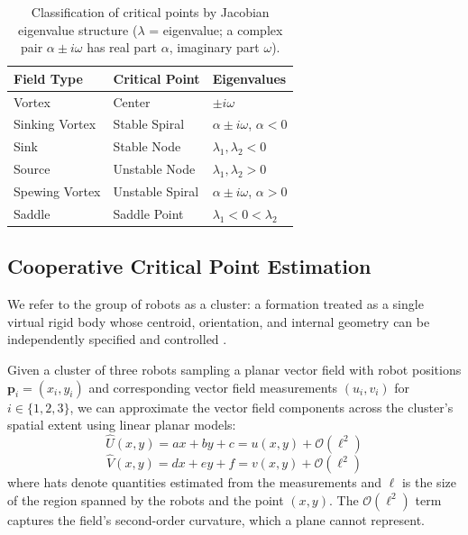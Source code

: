 \documentclass[lettersize,journal]{IEEEtran}
\begin{document}
\begin{table}[!t]
    \centering
    \caption{Classification of critical points by Jacobian eigenvalue structure ($\lambda$ = eigenvalue; a complex pair $\alpha \pm i\omega$ has real part $\alpha$, imaginary part $\omega$).}
    \label{tab:field_summary}
    \footnotesize
    \setlength{\tabcolsep}{2pt}
    \begin{tabular*}{\columnwidth}{@{\extracolsep{\fill}}lll}
    \hline
    \textbf{Field Type} & \textbf{Critical Point} & \textbf{Eigenvalues} \\
    \hline
    Vortex & Center & $\pm i\omega$ \\
    Sinking Vortex & Stable Spiral & $\alpha \pm i\omega$, $\alpha < 0$ \\
    Sink & Stable Node & $\lambda_1, \lambda_2 < 0$ \\
    Source & Unstable Node & $\lambda_1, \lambda_2 > 0$ \\
    Spewing Vortex & Unstable Spiral & $\alpha \pm i\omega$, $\alpha > 0$ \\
    Saddle & Saddle Point & $\lambda_1 < 0 < \lambda_2$ \\
    \hline
    \end{tabular*}
\end{table}


\subsection{Cooperative Critical Point Estimation}
\noindent

We refer to the group of robots as a cluster: a formation treated as a single virtual rigid body whose centroid, orientation, and internal geometry can be independently specified and controlled \cite{50,51}.

Given a cluster of three robots sampling a planar vector field with robot positions $\mathbf{p}_i = (x_i, y_i)$ and corresponding vector field measurements $(u_i, v_i)$ for $i \in \{1, 2, 3\}$, we can approximate the vector field components across the cluster's spatial extent using linear planar models:
\begin{equation}\label{eq:2}
\hat{U}(x,y) = ax + by + c = u(x,y) + \mathcal{O}(\ell^2)
\end{equation}
\begin{equation}\label{eq:3}
\hat{V}(x,y) = dx + ey + f = v(x,y) + \mathcal{O}(\ell^2)
\end{equation}
where hats denote quantities estimated from the measurements and $\ell$ is the size of the region spanned by the robots and the point $(x,y)$. The $\mathcal{O}(\ell^2)$ term captures the field's second-order curvature, which a plane cannot represent.
\end{document}
